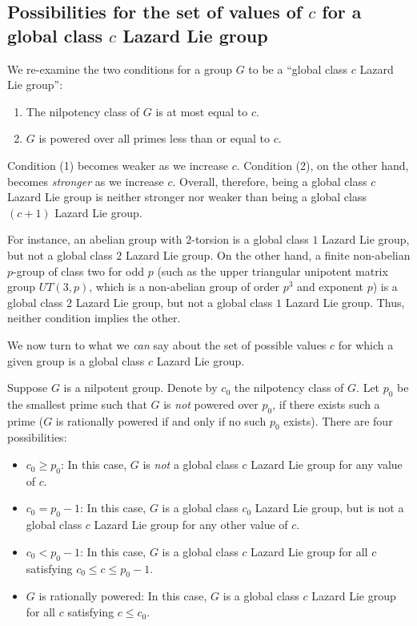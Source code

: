 \documentclass{ucetd}
\begin{document}
\subsection{Possibilities for the set of values of $c$ for a global class $c$ Lazard Lie group}\label{sec:global-class-c-multiple-c-values}

We re-examine the two conditions for a group $G$ to be a ``global
class $c$ Lazard Lie group'':

\begin{enumerate}
\item The nilpotency class of $G$ is at most equal to $c$.
\item $G$ is powered over all primes less than or equal to $c$.
\end{enumerate}

Condition (1) becomes weaker as we increase $c$. Condition (2), on the
other hand, becomes {\em stronger} as we increase $c$. Overall,
therefore, being a global class $c$ Lazard Lie group is neither
stronger nor weaker than being a global class $(c + 1)$ Lazard Lie
group.

For instance, an abelian group with $2$-torsion is a global class $1$
Lazard Lie group, but not a global class $2$ Lazard Lie group. On the
other hand, a finite non-abelian $p$-group of class two for odd $p$
(such as the upper triangular unipotent matrix group $UT(3,p)$, which
is a non-abelian group of order $p^3$ and exponent $p$) is a global
class $2$ Lazard Lie group, but not a global class $1$ Lazard Lie
group. Thus, neither condition implies the other.

We now turn to what we {\em can} say about the set of possible values
$c$ for which a given group is a global class $c$ Lazard Lie group.

Suppose $G$ is a nilpotent group. Denote by $c_0$ the nilpotency class
of $G$. Let $p_0$ be the smallest prime such that $G$ is {\em not}
powered over $p_0$, if there exists such a prime ($G$ is rationally
powered if and only if no such $p_0$ exists). There are four
possibilities:

\begin{itemize}
\item $c_0 \ge p_0$: In this case, $G$ is {\em not} a global class $c$
  Lazard Lie group for any value of $c$.
\item $c_0 = p_0 - 1$: In this case, $G$ is a global class $c_0$
  Lazard Lie group, but is not a global class $c$ Lazard Lie group for
  any other value of $c$.
\item $c_0 < p_0 - 1$: In this case, $G$ is a global class $c$ Lazard
  Lie group for all $c$ satisfying $c_0 \le c \le p_0 - 1$.
\item $G$ is rationally powered: In this case, $G$ is a global class
  $c$ Lazard Lie group for all $c$ satisfying $c \le c_0$.
\end{itemize}
\end{document}
